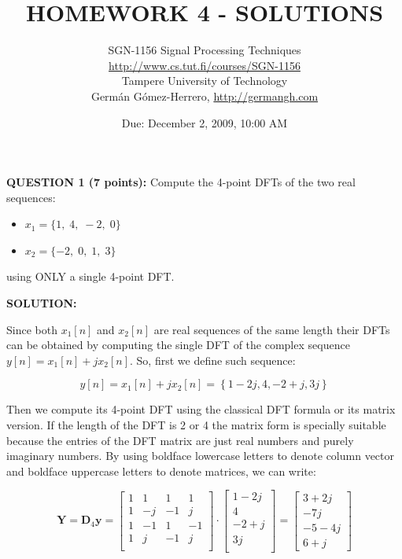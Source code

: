 \documentclass[a4paper,11pt,oneside]{article}
\title{\large{\textbf{HOMEWORK 4 - SOLUTIONS}}}
\author{SGN-1156 Signal Processing Techniques\\
\url{http://www.cs.tut.fi/courses/SGN-1156}\\
Tampere University of Technology\\
Germ\'an G\'omez-Herrero, \url{http://germangh.com}}
\date{Due: December 2, 2009, 10:00 AM}
\def\Y{{\mathbf Y}}
\def\y{{\mathbf y}}
\def\D{{\mathbf D}}
\begin{document}
\maketitle

\textbf{QUESTION 1 (7 points):} Compute the 4-point DFTs of the two real sequences:

\begin{itemize}
\item[] $x_{1}=\{1,\;4,\; -2,\; 0\}$
\item[] $x_{2}=\{-2,\; 0,\; 1,\; 3\}$
\end{itemize}

using ONLY a single 4-point DFT.

\vspace{1cm}

\textbf{SOLUTION:}

Since both $x_1[n]$ and $x_2[n]$ are real sequences of the same length their DFTs can be obtained by computing the single DFT of the complex sequence $y[n]=x_1[n]+jx_2[n]$. So, first we define such sequence:

\[
y[n] = x_1[n]+jx_2[n]=\left\{1-2j,4,-2+j,3j\right\}
\]

Then we compute its 4-point DFT using the classical DFT formula or its matrix version. If the length of the DFT is 2 or 4 the matrix form is specially suitable because the entries of the DFT matrix are just real numbers and purely imaginary numbers. By using boldface lowercase letters to denote column vector and boldface uppercase letters to denote matrices, we can write:

\[
\Y = \D_4\y = \left[
\begin{array}{rrrr}
1 & 1 &1 &1\\
1 & -j & -1 & j\\
1 & -1 & 1 & -1\\
1 & j & -1 & j\\
\end{array}
\right]
\cdot
\left[
\begin{array}{r}
1-2j\\
4\\
-2+j\\
3j\\
\end{array}
\right]=
\left[
\begin{array}{r}
3+2j\\
-7j\\
-5-4j\\
6+j
\end{array}
\right]
\]
\end{document}
